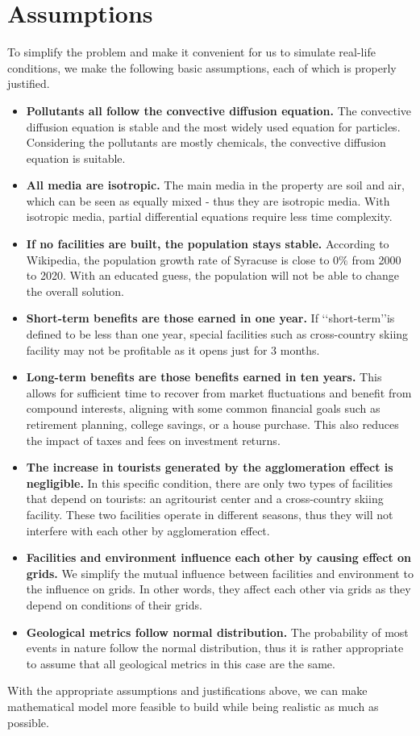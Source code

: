 \documentclass[./main.tex]{subfiles}
\begin{document}
    \section{Assumptions}
    To simplify the problem and make it convenient for us to simulate real-life conditions, we make the following
    basic assumptions, each of which is properly justified. 
    \begin{itemize}
        \item \textbf{Pollutants all follow the convective diffusion equation. }
        The convective diffusion equation is stable and the most widely used equation for particles.
        Considering the pollutants are mostly chemicals, the convective diffusion equation is suitable.
        \item \textbf{All media are isotropic. }
        The main media in the property are soil and air,
        which can be seen as equally mixed - thus they are isotropic media.
        With isotropic media, partial differential equations require less time complexity.
        \item \textbf{If no facilities are built, the population stays stable. }
        According to Wikipedia, the population growth rate of Syracuse is close to $0\%$ from 2000 to 2020.
        With an educated guess, the population will not be able to change the overall solution. 
        \item \textbf{Short-term benefits are those earned in one year. }
        If \lq\lq{short-term}\rq\rq is defined to be less than one year, special facilities such as cross-country skiing
        facility may not be profitable as it opens just for 3 months.
        \item \textbf{Long-term benefits are those benefits earned in ten years. }
        This allows for sufficient time to recover from market fluctuations and benefit from compound interests,
        aligning with some common financial goals such as retirement planning, college savings, or a house purchase.
        This also reduces the impact of taxes and fees on investment returns.
        \item \textbf{The increase in tourists generated by the agglomeration effect is negligible. }
        In this specific condition, there are only two types of facilities that depend on tourists: an agritourist
        center and a cross-country skiing facility.
        These two facilities operate in different seasons, thus they will not interfere with each other by
        agglomeration effect.
        \item \textbf{Facilities and environment influence each other by causing effect on grids. }
        We simplify the mutual influence between facilities and environment to the influence on grids.
        In other words, they affect each other via grids as they depend on conditions of their grids.
        \item \textbf{Geological metrics follow normal distribution. }
        The probability of most events in nature follow the normal distribution, thus it is rather appropriate to
        assume that all geological metrics in this case are the same.
    \end{itemize}

    With the appropriate assumptions and justifications above, we can make mathematical model more feasible to
    build while being realistic as much as possible.
\end{document}
